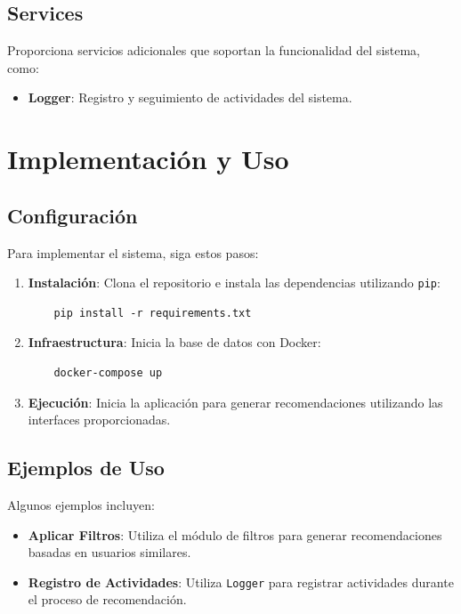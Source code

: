 \documentclass{llncs}
\begin{document}
\subsection{Services}
Proporciona servicios adicionales que soportan la funcionalidad del sistema, como:

\begin{itemize}
    \item \textbf{Logger}: Registro y seguimiento de actividades del sistema.
\end{itemize}

\section{Implementación y Uso}

\subsection{Configuración}
Para implementar el sistema, siga estos pasos:

\begin{enumerate}
    \item \textbf{Instalación}: Clona el repositorio e instala las dependencias utilizando \texttt{pip}:
    \begin{verbatim}
    pip install -r requirements.txt
    \end{verbatim}
    
    \item \textbf{Infraestructura}: Inicia la base de datos con Docker:
    \begin{verbatim}
    docker-compose up
    \end{verbatim}
    
    \item \textbf{Ejecución}: Inicia la aplicación para generar recomendaciones utilizando las interfaces proporcionadas.
\end{enumerate}

\subsection{Ejemplos de Uso}
Algunos ejemplos incluyen:

\begin{itemize}
    \item \textbf{Aplicar Filtros}: Utiliza el módulo de filtros para generar recomendaciones basadas en usuarios similares.
    \item \textbf{Registro de Actividades}: Utiliza \texttt{Logger} para registrar actividades durante el proceso de recomendación.
\end{itemize}
\end{document}

